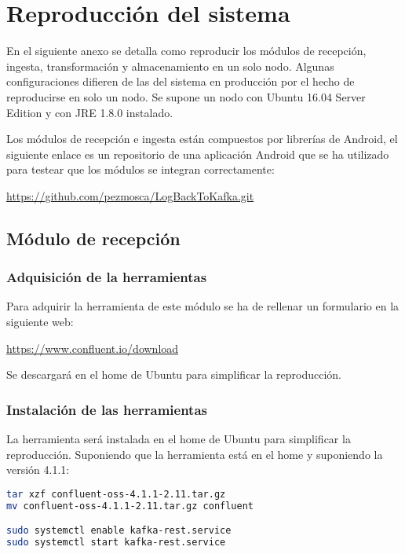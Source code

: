 \chapter{Reproducción del sistema}

En el siguiente anexo se detalla como reproducir los módulos de recepción, ingesta, transformación y almacenamiento en un solo nodo. Algunas configuraciones difieren de las del sistema en producción por el hecho de reproducirse en solo un nodo. Se supone un nodo con Ubuntu 16.04 Server Edition y con JRE 1.8.0 instalado.

Los módulos de recepción e ingesta están compuestos por librerías de Android, el siguiente enlace es un repositorio de una aplicación Android que se ha utilizado para testear que los módulos se integran correctamente:

\href{https://github.com/pezmosca/LogBackToKafka.git}{https://github.com/pezmosca/LogBackToKafka.git}

\section{Módulo de recepción}
\subsection{Adquisición de la herramientas}
Para adquirir la herramienta de este módulo se ha de rellenar un formulario en la siguiente web:

\href{https://www.confluent.io/download/}{https://www.confluent.io/download}

Se descargará en el home de Ubuntu para simplificar la reproducción.

\subsection{Instalación de las herramientas}
La herramienta será instalada en el home de Ubuntu para simplificar la reproducción. Suponiendo que la herramienta está en el home y suponiendo la versión 4.1.1:

\begin{lstlisting}[language=Bash]
tar xzf confluent-oss-4.1.1-2.11.tar.gz
mv confluent-oss-4.1.1-2.11.tar.gz confluent

sudo systemctl enable kafka-rest.service
sudo systemctl start kafka-rest.service
\end{lstlisting}

